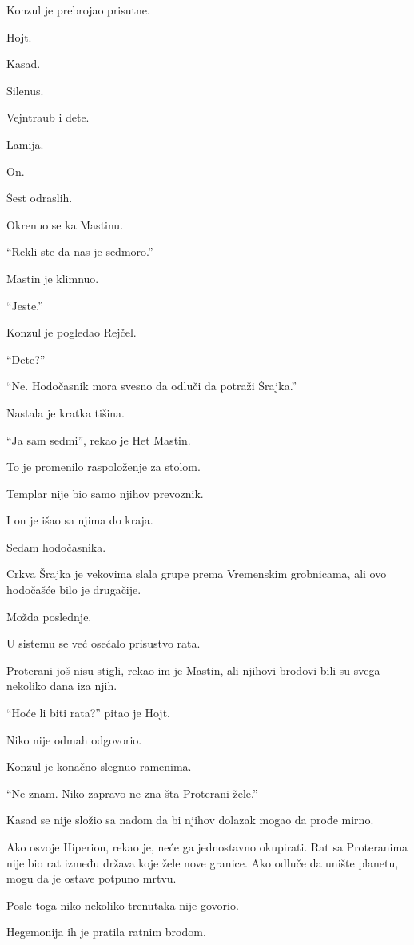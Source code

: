 Konzul je prebrojao prisutne.

Hojt.

Kasad.

Silenus.

Vejntraub i dete.

Lamija.

On.

Šest odraslih.

Okrenuo se ka Mastinu.

``Rekli ste da nas je sedmoro.''

Mastin je klimnuo.

``Jeste.''

Konzul je pogledao Rejčel.

``Dete?''

``Ne. Hodočasnik mora svesno da odluči da potraži Šrajka.''

Nastala je kratka tišina.

``Ja sam sedmi'', rekao je Het Mastin.

To je promenilo raspoloženje za stolom.

Templar nije bio samo njihov prevoznik.

I on je išao sa njima do kraja.

Sedam hodočasnika.

Crkva Šrajka je vekovima slala grupe prema Vremenskim grobnicama, ali ovo hodočašće bilo je drugačije.

Možda poslednje.

U sistemu se već osećalo prisustvo rata.

Proterani još nisu stigli, rekao im je Mastin, ali njihovi brodovi bili su svega nekoliko dana iza njih.

``Hoće li biti rata?'' pitao je Hojt.

Niko nije odmah odgovorio.

Konzul je konačno slegnuo ramenima.

``Ne znam. Niko zapravo ne zna šta Proterani žele.''

Kasad se nije složio sa nadom da bi njihov dolazak mogao da prođe mirno.

Ako osvoje Hiperion, rekao je, neće ga jednostavno okupirati. Rat sa Proteranima nije bio rat između država koje žele nove granice. Ako odluče da unište planetu, mogu da je ostave potpuno mrtvu.

Posle toga niko nekoliko trenutaka nije govorio.

Hegemonija ih je pratila ratnim brodom.

